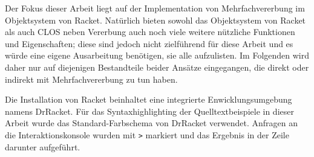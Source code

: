 Der Fokus dieser Arbeit liegt auf der Implementation von Mehrfachvererbung im Objektsystem von Racket. Natürlich bieten sowohl das Objektsystem von Racket als auch CLOS neben Vererbung auch noch viele weitere nützliche Funktionen und Eigenschaften; diese sind jedoch nicht zielführend für diese Arbeit und es würde eine eigene Ausarbeitung benötigen, sie alle aufzulisten. Im Folgenden wird daher nur auf diejenigen Bestandteile beider Ansätze eingegangen, die direkt oder indirekt mit Mehrfachvererbung zu tun haben. 

Die Installation von Racket beinhaltet eine integrierte Enwicklungsumgebung namens DrRacket. Für das Syntaxhighlighting der Quelltextbeispiele in dieser Arbeit wurde das Standard-Farbschema von DrRacket verwendet. Anfragen an die Interaktionskonsole wurden mit \texttt{>} markiert und das Ergebnis in der Zeile darunter aufgeführt. 